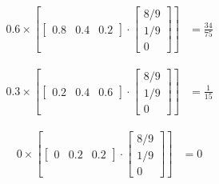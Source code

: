 \documentclass[answers]{exam}
\begin{document}
\begin{questions}
\begin{parts}
\begin{solution}
            \begin{align*}
                0.6 \times \left[\begin{bmatrix} 0.8 & 0.4 & 0.2 \end{bmatrix} \cdot \begin{bmatrix}
                                                                                             8/9 \\
                                                                                             1/9 \\
                                                                                             0
                                                                                         \end{bmatrix}\right] & = \frac{34}{75}
            \end{align*}

            \begin{align*}
                0.3 \times \left[\begin{bmatrix} 0.2 & 0.4 & 0.6 \end{bmatrix} \cdot \begin{bmatrix}
                                                                                             8/9 \\
                                                                                             1/9 \\
                                                                                             0
                                                                                         \end{bmatrix}\right] & = \frac{1}{15}
            \end{align*}

            \begin{align*}
                0 \times \left[\begin{bmatrix} 0 & 0.2 & 0.2 \end{bmatrix} \cdot \begin{bmatrix}
                                                                                         8/9 \\
                                                                                         1/9 \\
                                                                                         0
                                                                                     \end{bmatrix}\right] & = 0
            \end{align*}


\end{solution}
\end{parts}
\end{questions}
\end{document}
